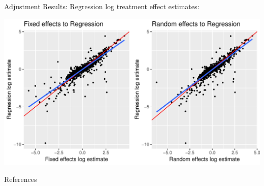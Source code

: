 \documentclass[english]{beamer}\usepackage[]{graphicx}\usepackage[]{color}
\makeatletter
\def\maxwidth{ %
  \ifdim\Gin@nat@width>\linewidth
    \linewidth
  \else
    \Gin@nat@width
  \fi
}
\newenvironment{knitrout}{}{} %
\makeatother
\begin{document}
\begin{frame}[fragile]{Adjustment Results: Regression}
log treatment effect estimates:

\vspace{-3mm}
\begin{knitrout}
\color{fgcolor}
\includegraphics[width=\maxwidth]{figure/unnamed-chunk-29-1} 

\end{knitrout}
\end{frame}





\begin{frame}{References}
  \small
  

\end{frame}





% 

\end{document}
